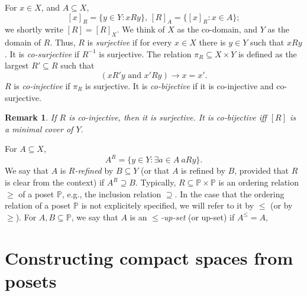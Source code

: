 \documentclass[12pt]{amsart}
\theoremstyle{plain}
\newtheorem{remark}[theorem]{\bf Remark}
\newcommand \Sp{{\mathsf{S}}}
\newcommand \PPb{\mathbb{P}}
\begin{document}
For $x \in X$, and $A\subseteq X$,  $$[x]_R = \{y \in Y : xRy \}, \, [R]_A=\{[x]_R: x \in A \};$$  we shortly write $[R]=[R]_X$. We think of $X$ as the co-domain, and $Y$ as the domain of $R$. Thus, $R$ is \emph{surjective} if for every $x \in X$ there is $y \in Y$ such that $xRy$. It is \emph{co-surjective} if $R^{-1}$ is surjective. The relation $\pi_R \subseteq X \times Y$ is defined as the largest $R' \subseteq R$ such that  
%
$$ (xR'y \mbox{ and }  x'Ry) \rightarrow x=x'.$$
%
$R$ is \emph{co-injective} if $\pi_R$ is surjective. It is \emph{co-bijective} if it is co-injective and co-surjective.

\begin{remark}
	\label{re:CoInjSurj}
	If $R$ is co-injective, then it is surjective. It is co-bijective iff $[R]$ is a minimal cover of $Y$.
\end{remark} 

For $A \subseteq X$,  $$A^R=\{y \in Y: \exists a \in A \ a R y  \}.$$
We say that $A$ is \emph{$R$-refined} by $B \subseteq Y$ (or that $A$ is refined by $B$, provided that $R$ is clear from the context) if $A^R \supseteq B$. Typically, $R \subseteq \PPb \times \PPb$ is  an ordering relation $\geq$ of a poset $\PPb$, e.g., the inclusion relation $\supseteq$.  In the case that the ordering relation of a poset $\PPb$ is not explicitely specified, we will refer to it by $\leq$ (or by $\geq$). For $A,B \subseteq \PPb$, we say that $A$ is an \emph{$\leq$-up-set} (or up-set) if $A^\leq=A$,

\section{Constructing compact spaces from posets}
\label{se:Constructing}
	
	
\end{document}
